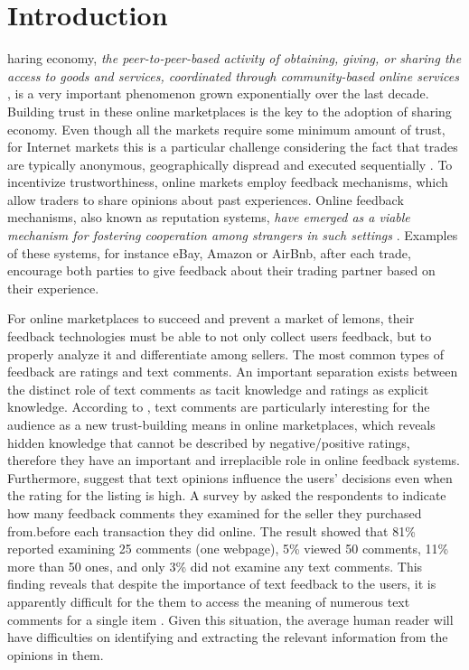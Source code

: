 %
%
\let\textcircled=\pgftextcircled
\chapter{Introduction}
\label{chap:intro}

haring economy, \textit{the peer-to-peer-based activity of obtaining, giving, or sharing the access  to  goods  and  services,  coordinated  through community-based online services} \cite{hamari2015sharing}, is a very important phenomenon grown exponentially over the last decade. Building trust in these online marketplaces is the key to the adoption of sharing economy. Even though all the markets require some minimum amount of trust, for Internet markets this is a particular challenge considering the fact that trades are typically anonymous, geographically dispread and executed sequentially \cite{owen2014trust}. To incentivize trustworthiness, online markets employ feedback mechanisms, which allow traders to share opinions about past experiences. Online feedback mechanisms, also known as reputation systems, \textit{have emerged as a viable mechanism for fostering cooperation among strangers in such settings} \cite{dellarocas2003digitization}. Examples of these systems, for instance eBay, Amazon or AirBnb, after each trade, encourage both parties to give feedback about their trading partner based on their experience. 

For online marketplaces to succeed and prevent a market of lemons, their feedback technologies must be able to not only collect users feedback, but to properly analyze it and differentiate among sellers. The most common types of feedback are ratings and text comments.  An important separation exists between the distinct role of text comments as tacit knowledge and ratings as explicit knowledge. According to \cite{pavlou2006nature}, text comments are particularly interesting for the audience as a new trust-building means in online marketplaces, which reveals hidden knowledge that cannot be described by negative/positive ratings, therefore they have an important and irreplacible role in online feedback systems. Furthermore, \cite{fradkin2016bias} suggest that text
opinions influence the users’ decisions even when the rating for the listing is high. A survey by \cite{pavlou2006institutional} asked the respondents to indicate how many feedback comments they examined for the seller they purchased from.before each transaction they did online. The result showed that 81\% reported examining 25 comments (one webpage), 5\% viewed 50 comments, 11\% more than 50 ones, and only 3\% did not examine any text comments. This finding reveals that despite the importance of text feedback to the users, it is apparently difficult for the them to access the meaning of numerous text comments for a single item \cite{pavlou2006institutional}.  Given this situation, the average human reader will have difficulties on identifying and extracting the relevant information from the opinions in them.  

